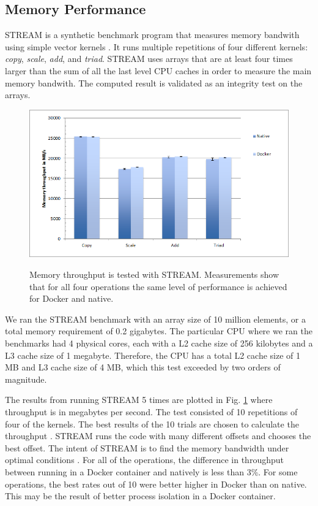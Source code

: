 \documentclass[11pt]{article}
\begin{document}
	\subsection{Memory Performance}
	STREAM is a synthetic benchmark program that measures memory bandwith using simple vector kernels \cite{mccalpin}. It runs multiple repetitions of four different kernels: \textit{copy}, \textit{scale}, \textit{add}, and \textit{triad}. STREAM uses arrays that are at least four times larger than the sum of all the last level CPU caches in order to measure the main memory bandwith. The computed result is validated as an integrity test on the arrays. 
	
	\begin{figure}
		\centering
		{\includegraphics[width=150mm]{mem}}
		\caption{  Memory throughput is tested with STREAM. Measurements show
			that for all four operations the same level of performance is achieved for Docker and native. }
		\label{fig:mem}
	\end{figure}
	
	
	We ran the
	STREAM benchmark with an array size of 10 million elements, or
	a total memory requirement of 0.2 gigabytes. The particular CPU
	where we ran the benchmarks had 4 physical cores, each with a L2 cache size of 256 kilobytes and a L3 cache size of 1 megabyte. 
	Therefore, the CPU has a total L2 cache size of 1 MB and L3 cache size of 4 MB, which this test exceeded by
	two orders of magnitude. 
	
	The results from running STREAM 5 times are plotted in Fig. \ref{fig:mem} where throughput is in megabytes per second. 
	The test consisted of 10 repetitions of four of the kernels. The best results of the 10 trials are chosen to calculate the throughput \cite{mccalpin}. STREAM runs the code with many different offsets and chooses the best offset. The intent of STREAM is to find the memory bandwidth under optimal conditions \cite{mccalpin2}. 
	For all of the operations, the difference in throughput between running in a Docker container and natively is less than 3\%. For some operations, the best rates out of 10 were better higher in Docker than on native. This may be the result of better process isolation in a Docker container. 
	
\end{document}
